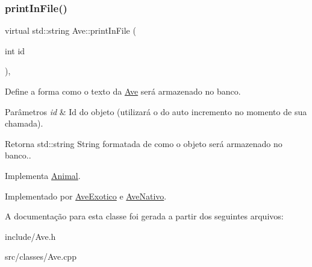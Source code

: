\subsubsection{\texorpdfstring{print\+In\+File()}{printInFile()}}
{\footnotesize\ttfamily virtual std\+::string Ave\+::print\+In\+File (\begin{DoxyParamCaption}\item[{int}]{id }\end{DoxyParamCaption})\hspace{0.3cm}{\ttfamily [protected]}, {}}



Define a forma como o texto da \hyperlink{classAve}{Ave} será armazenado no banco. 


\begin{DoxyParams}{Parâmetros}
{\em id} & Id do objeto (utilizará o do auto incremento no momento de sua chamada). \\
\hline
\end{DoxyParams}
\begin{DoxyReturn}{Retorna}
std\+::string String formatada de como o objeto será armazenado no banco.. 
\end{DoxyReturn}


Implementa \hyperlink{classAnimal_ac75406040726a6339932d70164cc7242}{Animal}.



Implementado por \hyperlink{classAveExotico_a4ba81def12131f047b3800e5f10a983b}{Ave\+Exotico} e \hyperlink{classAveNativo_ab95679ed20354b2183706db24899d316}{Ave\+Nativo}.



A documentação para esta classe foi gerada a partir dos seguintes arquivos\+:\begin{DoxyCompactItemize}
\item 
include/Ave.\+h\item 
src/classes/Ave.\+cpp\end{DoxyCompactItemize}
